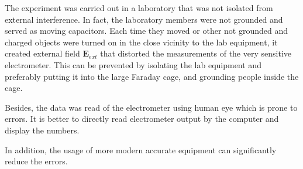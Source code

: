 The experiment was carried out in a laboratory that was not isolated from external interference. In fact, the laboratory members were not grounded and served as moving capacitors. Each time they moved or other not grounded and charged objects were turned on in the close vicinity to the lab equipment, it created external field $\mathbf{E}_{ext}$ that distorted the measurements of the very sensitive electrometer. This can be prevented by isolating the lab equipment and preferably putting it into the large Faraday cage, and grounding people inside the cage. 

Besides, the data was read of the electrometer using human eye which is prone to errors. It is better to directly read electrometer output by the computer and display the numbers.

In addition, the usage of more modern accurate equipment can significantly reduce the errors.
